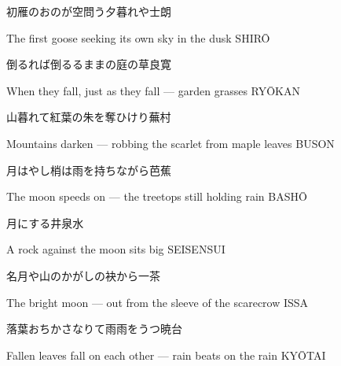 \begin{haiku}
    {\FH 初雁のおのが空問う夕暮れや}\hfill{\FH 士朗}

    \vin{} The first goose
    \vin{} \vin{} seeking its own sky
    \vin{} \vin{} \vin{} in the dusk \hspace{\fill} SHIR\={O}
\end{haiku}

\begin{haiku}
    {\FH 倒るれば倒るるままの庭の草}\hfill{\FH 良寛}

    \vin{} When they fall,
    \vin{} \vin{} just as they fall ---
    \vin{} \vin{} \vin{} garden grasses \hspace{\fill} RY\={O}KAN
\end{haiku}

\begin{haiku}
    {\FH 山暮れて紅葉の朱を奪ひけり}\hfill{\FH 蕪村}

    \vin{} Mountains darken ---
    \vin{} \vin{} robbing the scarlet
    \vin{} \vin{} \vin{} from maple leaves \hspace{\fill} BUSON
\end{haiku}

\begin{haiku}
    {\FH 月はやし梢は雨を持ちながら}\hfill{\FH 芭蕉}

    \vin{} The moon speeds on ---
    \vin{} \vin{} the treetops
    \vin{} \vin{} \vin{} still holding rain \hspace{\fill} BASH\={O}
\end{haiku}

\begin{haiku}
    {\FH {}月にする}\hfill{\FH 井泉水}

    \vin{} A rock
    \vin{} \vin{} against the moon
    \vin{} \vin{} \vin{} sits big \hspace{\fill} SEISENSUI
\end{haiku}

\begin{haiku}
    {\FH 名月や山のかがしの袂から}\hfill{\FH 一茶}

    \vin{} The bright moon ---
    \vin{} \vin{} out from the sleeve
    \vin{} \vin{} \vin{} of the scarecrow \hspace{\fill} ISSA
\end{haiku}

\begin{haiku}
    {\FH 落葉おちかさなりて雨雨をうつ}\hfill{\FH 暁台}

    \vin{} Fallen leaves
    \vin{} \vin{} fall on each other ---
    \vin{} \vin{} \vin{} rain beats on the rain \hspace{\fill} KY\={O}TAI
\end{haiku}

